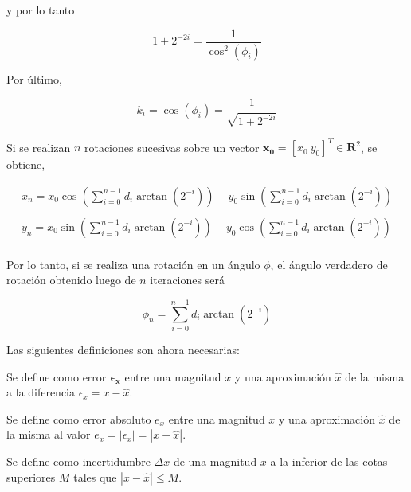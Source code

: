 y por lo tanto

\begin{equation}
1+2^{-2i}=\frac{1}{\cos^2{(\phi_i)}}
\end{equation}

Por último,

\begin{equation}
k_i=\cos{(\phi_i)}=\frac{1}{\sqrt{1+2^{-2i}}}
\end{equation}

Si se realizan $n$ rotaciones sucesivas sobre un vector $\mathbf{x_{0}}=\left[ x_{0} \ y_{0} \right] ^T \in
\mathbf{R}^2$, se obtiene,

\begin{equation}
\begin{array}{l}
x_{n} = x_0 \cos \left( \sum_{i=0}^{n-1}{d_{i}\arctan \left( 2^{-i} \right)  } \right) - y_0 \sin \left( \sum_{i=0}^{n-1}
{d_{i}\arctan \left( 2^{-i} \right)  } \right) \\
\\
y_{n}=x_0 \sin \left( \sum_{i=0}^{n-1}{d_{i}\arctan \left( 2^{-i} \right)  } \right) -y_0 \cos \left( \sum_{i=0}^{n-1}
{d_{i}\arctan \left( 2^{-i} \right)  } \right) \\
\end{array}
\end{equation}

Por lo tanto, si se realiza una rotación en un ángulo $\phi$, el ángulo verdadero de rotación obtenido luego de $n$
iteraciones será

\begin{equation}
\label{ec5}
\phi_{n}=\sum_{i=0}^{n-1} d_{i} \arctan \left( 2^{-i} \right)
\end{equation}

Las siguientes definiciones son ahora necesarias:

\begin{defi}
Se define como error $\mathbf{\epsilon_x}$ entre una magnitud $x$ y una aproximación $\hat{x}$ de la misma a la
diferencia $\epsilon_x=x-\hat{x}$.
\end{defi}

\begin{defi}
Se define como error absoluto $e_x$ entre una magnitud $x$ y una aproximación $\hat{x}$ de la misma al valor
$e_x=|\epsilon_x|=|x-\hat{x}|$.
\end{defi}

\begin{defi}
Se define como incertidumbre $\Delta x$ de una magnitud $x$ a la inferior de las cotas superiores $M$ tales que
$|x-\hat{x}|\le M$.
\end{defi}

